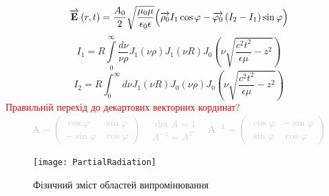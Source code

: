%
\begin{equation} \label{eq:linear_e_cyl}
\overrightarrow{\mathbf E} \left( r, t \right) = \frac{A_0}{2} 
\sqrt{\frac{\mu_0 \mu}{\epsilon_0 \epsilon}}
\Big( \overrightarrow{\mathbf \rho_0} I_1 \cos \varphi - 
\overrightarrow{\mathbf  \varphi_0 } \left( I_2 - I_1 \right) \sin \varphi \Big)
\end{equation}
%
\begin{equation*}
I_1 = R \int \limits_{0}^{\infty} \frac{d \nu}{\nu \rho} J_1 (\nu \rho) 
J_1 (\nu R) J_0 \left( \nu \sqrt{\frac{c^2 t^2}{\epsilon \mu} - z^2} \right)
\end{equation*}
%
\begin{equation*}
I_2 = R \int_{0}^{\infty} d \nu J_1 (\nu R) 
J_0 (\nu \rho) J_0 \left( \nu \sqrt{\frac{c^2 t^2}{\epsilon \mu} - z^2} \right)
\end{equation*}
%
\textcolor{red} { Правильній перехід до декартових векторних кординат? } 
%
\textcolor{lightgray} { \begin{equation*} \begin{aligned}
\mathbf{A} = \left( \begin{array}{cc}
\cos \varphi & \sin \varphi \\
- \sin \varphi & \cos \varphi
\end{array} \right) \begin{array}{ccc}
	& \det A = 1 		&	\\
	& A^{-1} = A^{T}	&
\end{array} 
\mathbf{A^{-1}} = \left( \begin{array}{cc}
\cos \varphi & - \sin \varphi \\
\sin \varphi & \cos \varphi
\end{array} \right) 
\end{aligned} \end{equation*} }
%
\begin{figure}[h] \begin{center}
\texttt{[image: PartialRadiation]}
\caption{Фізичний зміст областей випромінювання} \label{fig:part_rad}
\end{center} \end{figure}
%
